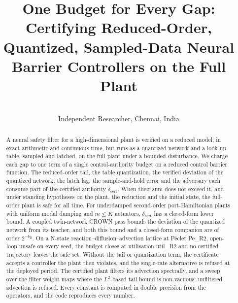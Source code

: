 


\title[One Budget for Every Gap]{One Budget for Every Gap: Certifying Reduced-Order, Quantized, Sampled-Data Neural Barrier Controllers on the Full Plant}
\author[Anu Karthika]{\\ \addr Independent Researcher, Chennai, India}


\maketitle

\begin{abstract}
A neural safety filter for a high-dimensional plant is verified on a reduced model, in exact arithmetic and continuous time, but runs as a quantized network and a look-up table, sampled and latched, on the full plant under a bounded disturbance. We charge each gap to one term of a single control-authority budget on a reduced control barrier function. The reduced-order tail, the table quantization, the verified deviation of the quantized network, the latch lag, the sample-and-hold error and the adversary each consume part of the certified authority $\delta_{\mathrm{cert}}$. When their sum does not exceed it, and under standing hypotheses on the plant, the reduction and the initial state, the full-order plant is safe for all time. For underdamped second-order port-Hamiltonian plants with uniform modal damping and $m \le K$ actuators, $\delta_{\mathrm{cert}}$ has a closed-form lower bound. A coupled twin-network CROWN pass bounds the deviation of the quantized network from its teacher, and both this bound and a closed-form companion are of order $2^{-b_B}$. On a {{N}}-state reaction--diffusion--advection lattice at P\'eclet {{Pe_R2}}, open-loop unsafe on every seed, the budget closes at utilisation {{util_R2}} and no certified trajectory leaves the safe set. Without the tail or quantization term, the certificate accepts a controller the plant then violates, and the single-rate alternative is refused at the deployed period. The certified plant filters its advection spectrally, and a sweep over the filter weight maps where the $L^2$-based tail bound is non-vacuous; unfiltered advection is refused. Every constant is computed in double precision from the operators, and the code reproduces every number.
\end{abstract}

